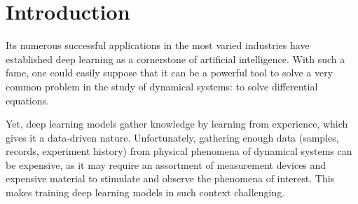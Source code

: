 \chapter{Introduction}







Its numerous successful applications in the most varied industries \cite{ciregan_multi-column_2012,krizhevsky_imagenet_2012,silver_mastering_2016} have established deep learning as a cornerstone of artificial intelligence.
With such a fame, one could easily suppose that it can be a powerful tool to solve a very common problem in the study of dynamical systems: to solve differential equations.

Yet, deep learning models gather knowledge by learning from experience, which gives it a data-driven nature.
Unfortunately, gathering enough data (samples, records, experiment history) from physical phenomena of dynamical systems can be expensive, as it may require an assortment of measurement devices and expensive material to stimulate and observe the phenomena of interest.
This makes training deep learning models in such context challenging.

